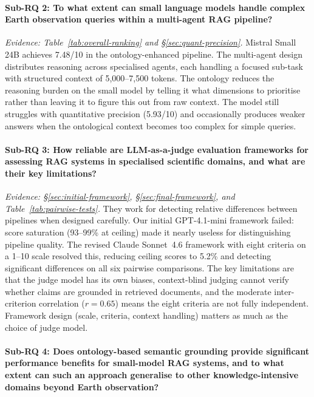 \paragraph{Sub-RQ 2: To what extent can small language models handle complex Earth observation queries within a multi-agent RAG pipeline?}

\noindent\emph{Evidence: Table~\ref{tab:overall-ranking} and \S\ref{sec:quant-precision}.}
Mistral Small 24B achieves 7.48/10 in the ontology-enhanced pipeline. The multi-agent design distributes reasoning across specialised agents, each handling a focused sub-task with structured context of 5{,}000--7{,}500 tokens. The ontology reduces the reasoning burden on the small model by telling it what dimensions to prioritise rather than leaving it to figure this out from raw context. The model still struggles with quantitative precision (5.93/10) and occasionally produces weaker answers when the ontological context becomes too complex for simple queries.

\paragraph{Sub-RQ 3: How reliable are LLM-as-a-judge evaluation frameworks for assessing RAG systems in specialised scientific domains, and what are their key limitations?}

\noindent\emph{Evidence: \S\ref{sec:initial-framework}, \S\ref{sec:final-framework}, and Table~\ref{tab:pairwise-tests}.}
They work for detecting relative differences between pipelines when designed carefully. Our initial GPT-4.1-mini framework failed: score saturation (93--99\% at ceiling) made it nearly useless for distinguishing pipeline quality. The revised Claude Sonnet~4.6 framework with eight criteria on a 1--10 scale resolved this, reducing ceiling scores to 5.2\% and detecting significant differences on all six pairwise comparisons. The key limitations are that the judge model has its own biases, context-blind judging cannot verify whether claims are grounded in retrieved documents, and the moderate inter-criterion correlation ($r = 0.65$) means the eight criteria are not fully independent. Framework design (scale, criteria, context handling) matters as much as the choice of judge model.

\paragraph{Sub-RQ 4: Does ontology-based semantic grounding provide significant performance benefits for small-model RAG systems, and to what extent can such an approach generalise to other knowledge-intensive domains beyond Earth observation?}

